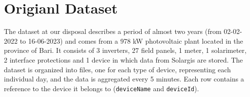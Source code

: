 \section{Origianl Dataset} \label{sec:dataset}

The dataset at our disposal describes a period of almost two years
(from 02-02-2022 to 16-06-2023) and comes from a 978 kW photovoltaic
plant located in the province of Bari. It consists of 3 inverters,
27 field panels, 1 meter, 1 solarimeter, 2 interface protections
and 1  device in which data from Solargis are stored.
The dataset is organized into files, one for each type of device,
representing each individual day, and the data is aggregated
every 5 minutes. Each row contains a reference to the device
it belongs to (\verb|deviceName| and \verb|deviceId|).



